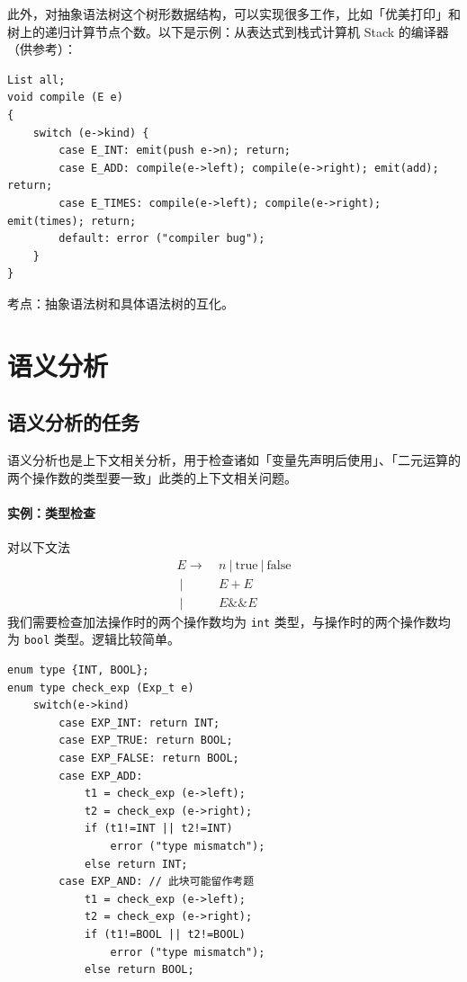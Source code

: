 \documentclass[UTF8]{ctexart}
\newcommand\OR{\ |\ }
\newcommand\Emph[1]{\textcolor{cyan!80!black}{#1}}
\begin{document}
此外，对抽象语法树这个树形数据结构，可以实现很多工作，比如「优美打印」和树上的递归计算节点个数。以下是示例：从表达式到栈式计算机 Stack 的编译器（供参考）：
\begin{lstlisting}
List all;
void compile (E e)
{
    switch (e->kind) {
        case E_INT: emit(push e->n); return;
        case E_ADD: compile(e->left); compile(e->right); emit(add); return;
        case E_TIMES: compile(e->left); compile(e->right); emit(times); return;
        default: error ("compiler bug");
    }
}
\end{lstlisting}

\Emph{考点}：抽象语法树和具体语法树的互化。

\section{语义分析}
\subsection{语义分析的任务}
\Emph{语义分析}也是上下文相关分析，用于检查诸如「变量先声明后使用」、「二元运算的两个操作数的类型要一致」此类的上下文相关问题。

\paragraph{实例：类型检查} 对以下文法
\begin{equation}\label{eq:G-type}
\begin{split}
   E\to\  & n \OR \text{true} \OR \text{false} \\
    \OR & E+E \\
    \OR & E \&\& E
\end{split}
\end{equation}
我们需要检查加法操作时的两个操作数均为 \verb!int! 类型，与操作时的两个操作数均为 \verb!bool! 类型。逻辑比较简单。

\begin{lstlisting}
enum type {INT, BOOL};
enum type check_exp (Exp_t e)
    switch(e->kind)
        case EXP_INT: return INT;
        case EXP_TRUE: return BOOL;
        case EXP_FALSE: return BOOL;
        case EXP_ADD:
            t1 = check_exp (e->left);
            t2 = check_exp (e->right);
            if (t1!=INT || t2!=INT)
                error ("type mismatch");
            else return INT;
        case EXP_AND: // 此块可能留作考题
            t1 = check_exp (e->left);
            t2 = check_exp (e->right);
            if (t1!=BOOL || t2!=BOOL)
                error ("type mismatch");
            else return BOOL;
\end{lstlisting}
\end{document}
